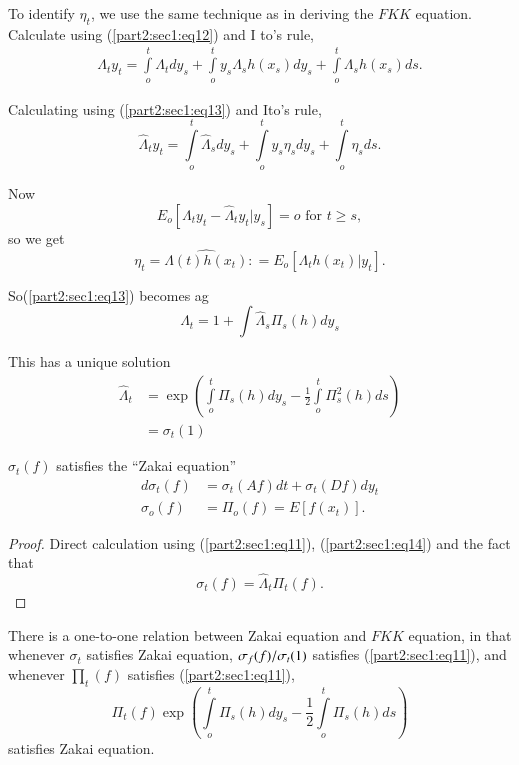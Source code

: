 To identify $\eta_t$, we use the same technique as in deriving the
$FKK$ equation. Calculate using (\ref{part2:sec1:eq12}) and I to's rule, 
\begin{gather*}
  \Lambda_t y_t= \int \limits^t_o \Lambda_t dy_s + \int \limits^t_o y_s
  \Lambda_s h(x_s)dy_s + \int \limits^t_o\Lambda_s h(x_s)ds.
\end{gather*}

Calculating using (\ref{part2:sec1:eq13}) and Ito's rule,
$$
\hat{\Lambda}_ty_t = \int \limits_o^t \hat {\Lambda}_s dy_s +\int
\limits_o^t y_s \eta_s dy_s + \int \limits_o^t  \eta_s ds. 
$$

Now 
$$
E_o[\Lambda_t y_t- \hat{\Lambda}_t y_t |y_s]=o \text{ for } t \geq s, 
$$
so we get
$$
\eta_t = \widehat{\Lambda (t)h(x_t)}: = E_o [\Lambda_th(x_t)|y_t].
$$

So\pageoriginale (\ref{part2:sec1:eq13}) becomes
ag\begin{equation*}
\hat{\Lambda}_t = 1 + \int \limits \hat {\Lambda}_s \Pi_s (h)dy_s
\tag{14}\label{part2:sec1:eq14} 
\end{equation*}

This has a unique solution
\begin{align*}
\hat{\Lambda}_t  & = \exp \left(\int \limits^t_o \Pi_s (h) dy_s-
\frac{1}{2} \int \limits^t_o \Pi^2_s(h) ds \right)\\ 
&= \sigma _t (1)
\end{align*}

\begin{theorem}%
  $\sigma _t(f)$ satisfies the ``Zakai equation''
  \begin{align*}
    d\sigma _t(f) & = \sigma _t (Af) dt + \sigma _t(Df) dy_t
    \tag{15}\label{part2:sec1:eq15}\\ 
    \sigma _o(f) & = \Pi _o (f)=E [f(x_t)].
  \end{align*}
\end{theorem}

\begin{proof}
Direct calculation using (\ref{part2:sec1:eq11}),
(\ref{part2:sec1:eq14}) and the fact that  
$$
\sigma _t(f)= \hat{\Lambda}_t \Pi_t (f).
$$
\end{proof}

\begin{coro} %
  There is a one-to-one relation between Zakai equation and $FKK$
  equation, in that whenever $\sigma_t$ satisfies Zakai equation,
  $\sigma_f(f)/\break\sigma_t (1)$ satisfies (\ref{part2:sec1:eq11}), and
  whenever $\prod _t   (f)$ satisfies (\ref{part2:sec1:eq11}), 
  $$
  \Pi _t (f) \exp \left(\int \limits^t_o \Pi_s (h)dy_s- \frac{1}{2}
  \int \limits^t_o \Pi_s (h)ds \right) 
  $$
satisfies Zakai equation.
\end{coro}

